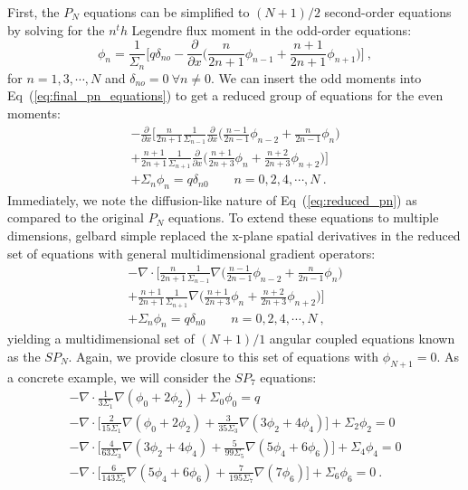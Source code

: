 First, the $P_N$ equations can be simplified to $(N+1)/2$ second-order
equations by solving for the $n^th$ Legendre flux moment in the
odd-order equations:
\begin{equation}
  \phi_n = \frac{1}{\Sigma_n}\Bigg[ q \delta_{no} -
    \frac{\partial}{\partial x}\Big(\frac{n}{2n+1}\phi_{n-1} +
    \frac{n+1}{2n+1} \phi_{n+1} \Big) \Bigg]\:, 
  \label{eq:odd_moments}
\end{equation}
for $n = 1,3,\cdots,N$ and $\delta_{no} = 0\ \forall n \neq 0$. We can
insert the odd moments into Eq~(\ref{eq:final_pn_equations}) to get a
reduced group of equations for the even moments:
\begin{multline}
  -\frac{\partial}{\partial x}
  \Bigg[\frac{n}{2n+1}\frac{1}{\Sigma_{n-1}} \frac{\partial}{\partial
      x} \Big(\frac{n-1}{2n-1} \phi_{n-2} + \frac{n}{2n-1}\phi_n \Big)
    \\+ \frac{n+1}{2n+1}\frac{1}{\Sigma_{n+1}} \frac{\partial}{\partial
      x} \Big(\frac{n+1}{2n+3}\phi_n + \frac{n+2}{2n+3}\phi_{n+2}\Big)
    \Bigg] \\+ \Sigma_n \phi_n = q \delta_{n0}\ \ \ \ \ \ \ \ \ n =
  0,2,4,\cdots,N\:.
  \label{eq:reduced_pn}
\end{multline}
Immediately, we note the diffusion-like nature of
Eq~(\ref{eq:reduced_pn}) as compared to the original $P_N$
equations. To extend these equations to multiple dimensions, gelbard
simple replaced the x-plane spatial derivatives in the reduced set of
equations with general multidimensional gradient operators:
\begin{multline}
  -\nabla \cdot \Bigg[\frac{n}{2n+1}\frac{1}{\Sigma_{n-1}} \nabla
    \Big(\frac{n-1}{2n-1} \phi_{n-2} + \frac{n}{2n-1}\phi_n \Big) \\+
    \frac{n+1}{2n+1}\frac{1}{\Sigma_{n+1}} \nabla
    \Big(\frac{n+1}{2n+3}\phi_n + \frac{n+2}{2n+3}\phi_{n+2}\Big)
    \Bigg] \\+ \Sigma_n \phi_n = q \delta_{n0}\ \ \ \ \ \ \ \ \ n =
  0,2,4,\cdots,N\:,
  \label{eq:spn_equations}
\end{multline}
yielding a multidimensional set of $(N+1)/1$ angular coupled equations
known as the $SP_N$. Again, we provide closure to this set of
equations with $\phi_{N+1} = 0$. As a concrete example, we will
consider the $SP_7$ equations:
\begin{subequations}
  \begin{gather}
    -\nabla \cdot \frac{1}{3 \Sigma_1} \nabla ( \phi_0 + 2\phi_2 ) +
    \Sigma_0 \phi_0 = q \\ 
    -\nabla \cdot \Bigg[ \frac{2}{15 \Sigma_1} \nabla ( \phi_0 + 2\phi_2
      ) + \frac{3}{35 \Sigma_3}\nabla( 3\phi_2 + 4\phi_4)\Bigg] +
    \Sigma_2 \phi_2 = 0\\
    -\nabla \cdot \Bigg[ \frac{4}{63 \Sigma_3} \nabla ( 3\phi_2 +
      4\phi_4 ) + \frac{5}{99 \Sigma_5}\nabla( 5\phi_4 +
      6\phi_6)\Bigg] + \Sigma_4 \phi_4 = 0\\
    -\nabla \cdot \Bigg[ \frac{6}{143 \Sigma_5} \nabla ( 5\phi_4 +
      6\phi_6 ) + \frac{7}{195 \Sigma_7}\nabla(7\phi_6)\Bigg] +
    \Sigma_6 \phi_6 = 0 \:.
  \end{gather}
  \label{eq:sp7_equations}
\end{subequations}

